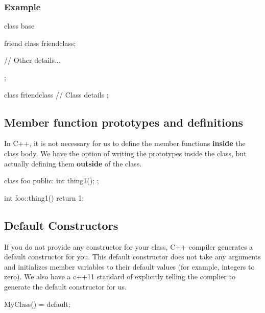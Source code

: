 \documentclass{report}
\begin{document}
    \subsubsection{Example}
    \bigbreak \noindent 
    \begin{cppcode}
        class base {
            friend class friendclass;

            // Other details...
        };

        class friendclass {
            // Class details
        };
    \end{cppcode}



    

    \pagebreak 
    \subsection{Member function prototypes and definitions}
    \bigbreak \noindent 
    In C++, it is not necessary for us to define the member functions \textbf{inside} the class body. We have the option of writing the prototypes inside the class, but actually defining them \textbf{outside} of the class.
    \bigbreak \noindent 
    
    \begin{cppcode}
class foo {
public:
    int thing1();
};

int foo::thing1() {
    return 1;
}
    \end{cppcode}
    
    \bigbreak \noindent 
    

    \pagebreak
    \subsection{Default Constructors}
    \bigbreak \noindent 
    \begin{concept}
        If you do not provide any constructor for your class, C++ compiler generates a default constructor for you. This default constructor does not take any arguments and initializes member variables to their default values (for example, integers to zero).
        \bigbreak \noindent 
        We also have a c++11 standard of explicitly telling the complier to generate the default constructor for us.
        \bigbreak \noindent 
        \begin{cppcode}
        MyClass() = default;
        \end{cppcode}
    \end{concept}
\end{document}
